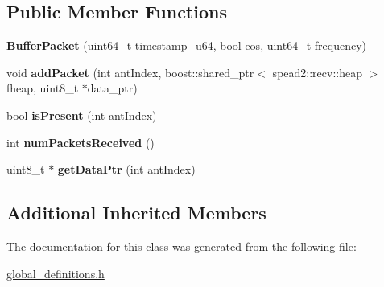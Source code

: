\subsection*{Public Member Functions}
\begin{DoxyCompactItemize}
\item 
{\bfseries Buffer\+Packet} (uint64\+\_\+t timestamp\+\_\+u64, bool eos, uint64\+\_\+t frequency)\hypertarget{class_buffer_packet_ac84d6bfbc4e7616132810ea8c08ccb40}{}\label{class_buffer_packet_ac84d6bfbc4e7616132810ea8c08ccb40}

\item 
void {\bfseries add\+Packet} (int ant\+Index, boost\+::shared\+\_\+ptr$<$ spead2\+::recv\+::heap $>$ fheap, uint8\+\_\+t $\ast$data\+\_\+ptr)\hypertarget{class_buffer_packet_a5dc802a9c8e94b4a4e478721b6c57731}{}\label{class_buffer_packet_a5dc802a9c8e94b4a4e478721b6c57731}

\item 
bool {\bfseries is\+Present} (int ant\+Index)\hypertarget{class_buffer_packet_adc0283c887da351a605f90d479ebb368}{}\label{class_buffer_packet_adc0283c887da351a605f90d479ebb368}

\item 
int {\bfseries num\+Packets\+Received} ()\hypertarget{class_buffer_packet_ab038cecaa429f7cbf305d5ca0aeb972b}{}\label{class_buffer_packet_ab038cecaa429f7cbf305d5ca0aeb972b}

\item 
uint8\+\_\+t $\ast$ {\bfseries get\+Data\+Ptr} (int ant\+Index)\hypertarget{class_buffer_packet_a92a029d17dc1f7f05fb53e3cdc4283ce}{}\label{class_buffer_packet_a92a029d17dc1f7f05fb53e3cdc4283ce}

\end{DoxyCompactItemize}
\subsection*{Additional Inherited Members}


The documentation for this class was generated from the following file\+:\begin{DoxyCompactItemize}
\item 
\hyperlink{global__definitions_8h}{global\+\_\+definitions.\+h}\end{DoxyCompactItemize}
